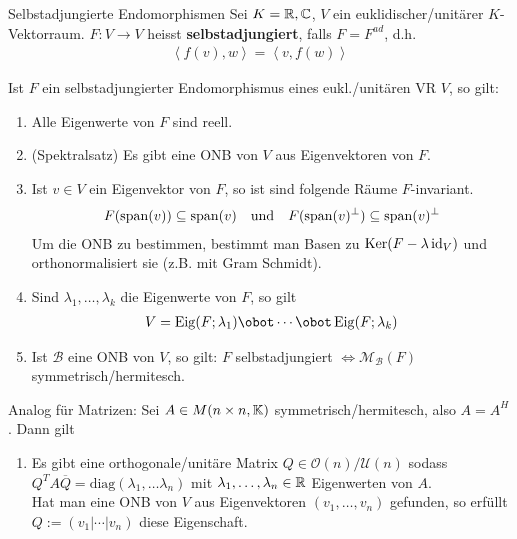 \begin{definition}{Selbstadjungierte Endomorphismen}
    Sei $K = \mathbb{R}, \mathbb{C}$, $V$ ein euklidischer/unitärer $K$-Vektorraum. 
    $F: V \to V$ heisst \textbf{selbstadjungiert}, falls $F = F^{ad}$, d.h.
    \begin{align*}
        \left<f(v),w\right> = \left<v,f(w)\right>
    \end{align*}
\end{definition}
Ist $F$ ein selbstadjungierter Endomorphismus eines eukl./unitären VR $V$, so gilt:
\begin{enumerate}
    \item   Alle Eigenwerte von $F$ sind reell.
    \item   (Spektralsatz) \quad Es gibt eine ONB von $V$ aus Eigenvektoren von $F$.
    \item   Ist $v \in V$ ein Eigenvektor von $F$, so ist sind folgende Räume $F$-invariant.
    \begin{align*}
        F(\operatorname{span}(v)) \subseteq \operatorname{span}(v) \quad \text{und} \quad F(\operatorname{span}(v)^{\bot}) \subseteq \operatorname{span}(v)^{\bot} 
    \end{align*}
    Um die ONB zu bestimmen, bestimmt man Basen zu $\operatorname{Ker}(F - \lambda \operatorname{id}_V)$ und orthonormalisiert sie (z.B. mit Gram Schmidt).
    \item   Sind $\lambda_1, \ldots, \lambda_k$ die Eigenwerte von $F$, so gilt
    \begin{align*}
        V = \Eig(F;\lambda_1) \obot \cdots \obot \Eig(F;\lambda_k)
    \end{align*}
    \item   Ist $\mathcal{B}$ eine ONB von $V$, so gilt: $F$ selbstadjungiert $\Leftrightarrow \mathcal{M}_{\mathcal{B}}(F)$ symmetrisch/hermitesch. 
\end{enumerate} 
Analog für Matrizen: Sei $A \in M(n\times n,\mathbb{K})$ symmetrisch/hermitesch, also $A = A^H$. Dann gilt
\begin{enumerate}
    \item   Es gibt eine orthogonale/unitäre Matrix $Q \in \mathcal{O}(n)/ \mathcal{U}(n)$ sodass $Q^TA \overline{Q} = \text{diag}(\lambda_1, \ldots \lambda_n)$ mit $\lambda_{1}, \ldots, \lambda_{n} \in \mathbb{R}$ Eigenwerten von $A$.\\
    
    Hat man eine ONB von $V$ aus Eigenvektoren $(v_1, \ldots, v_n)$ gefunden, so erfüllt $Q := (v_1| \cdots | v_n)$ diese Eigenschaft.
\end{enumerate}




